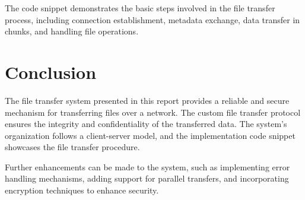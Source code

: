 \documentclass{article}
\begin{document}
The code snippet demonstrates the basic steps involved in the file transfer process, including connection establishment, metadata exchange, data transfer in chunks, and handling file operations.

\section{Conclusion}
The file transfer system presented in this report provides a reliable and secure mechanism for transferring files over a network. The custom file transfer protocol ensures the integrity and confidentiality of the transferred data. The system's organization follows a client-server model, and the implementation code snippet showcases the file transfer procedure.

Further enhancements can be made to the system, such as implementing error handling mechanisms, adding support for parallel transfers, and incorporating encryption techniques to enhance security.
\end{document}

